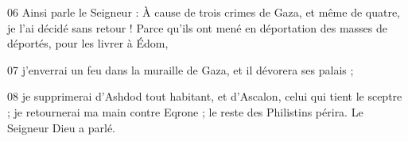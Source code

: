
06 Ainsi parle le Seigneur : À cause de trois crimes de Gaza, et même de quatre, je l’ai décidé sans retour ! Parce qu’ils ont mené en déportation des masses de déportés, pour les livrer à Édom,

07 j’enverrai un feu dans la muraille de Gaza, et il dévorera ses palais ;

08 je supprimerai d’Ashdod tout habitant, et d’Ascalon, celui qui tient le sceptre ; je retournerai ma main contre Eqrone ; le reste des Philistins périra. Le Seigneur Dieu a parlé.